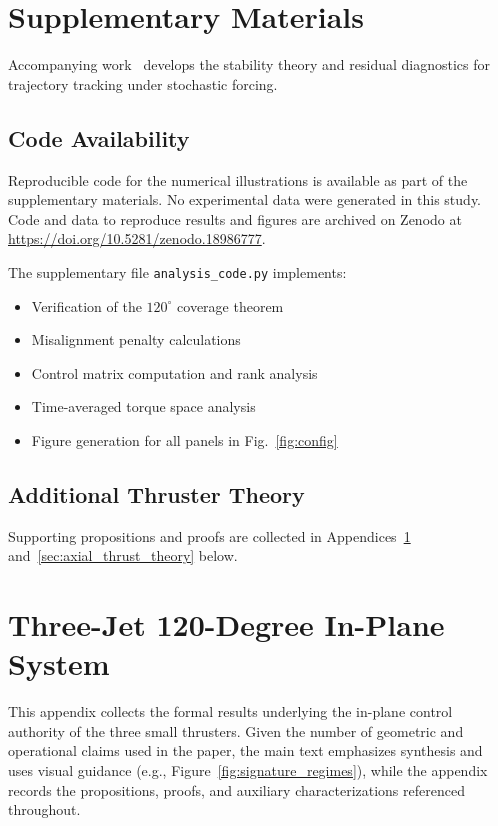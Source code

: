 \documentclass{article}
\begin{document}
\section*{Supplementary Materials}

\noindent Accompanying work~\cite{andree2026stability} develops the stability theory and residual diagnostics for trajectory tracking under stochastic forcing.

\subsection*{Code Availability}
Reproducible code for the numerical illustrations is available as part of the supplementary materials. No experimental data were generated in this study.
Code and data to reproduce results and figures are archived on Zenodo at \url{https://doi.org/10.5281/zenodo.18986777}.

The supplementary file \texttt{analysis\_code.py} implements:

\begin{itemize}
    \item Verification of the $120^\circ$ coverage theorem
    \item Misalignment penalty calculations
    \item Control matrix computation and rank analysis
    \item Time-averaged torque space analysis
    \item Figure generation for all panels in Fig.~\ref{fig:config}
\end{itemize}

\subsection*{Additional Thruster Theory}
Supporting propositions and proofs are collected in Appendices~\ref{sec:thruster_theory} and~\ref{sec:axial_thrust_theory} below.

\appendix

\section{Three-Jet 120-Degree In-Plane System}
\label{sec:thruster_theory}

This appendix collects the formal results underlying the in-plane control authority of the three small thrusters. Given the number of geometric and operational claims used in the paper, the main text emphasizes synthesis and uses visual guidance (e.g., Figure~\ref{fig:signature_regimes}), while the appendix records the propositions, proofs, and auxiliary characterizations referenced throughout.
\end{document}
